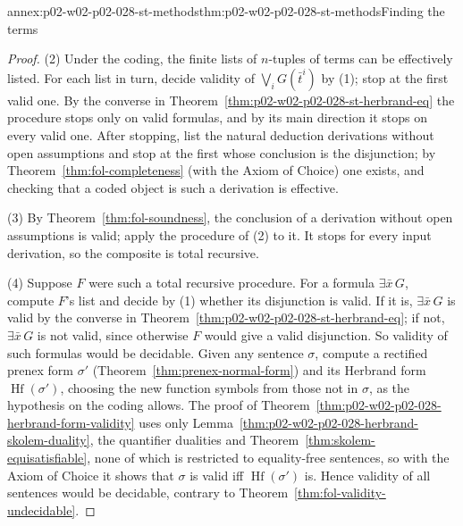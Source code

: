 \begin{annexitem}{annex:p02-w02-p02-028-st-methods}{thm:p02-w02-p02-028-st-methods}{Finding the terms}
\begin{proof}
(2)  Under the coding, the finite lists of \(n\)-tuples of terms can be
effectively listed.  For each list in turn, decide validity of
\(\bigvee_iG(\bar t^i)\) by (1); stop at the first valid one.  By the
converse in Theorem~\ref{thm:p02-w02-p02-028-st-herbrand-eq} the procedure
stops only on valid formulas, and by its main direction it stops on every
valid one.  After stopping, list the natural deduction derivations without
open assumptions and stop at the first whose conclusion is the disjunction;
by Theorem~\ref{thm:fol-completeness} (with the Axiom of Choice) one exists,
and checking that a coded object is such a derivation is effective.

(3)  By Theorem~\ref{thm:fol-soundness}, the conclusion of a derivation
without open assumptions is valid; apply the procedure of (2) to it.  It
stops for every input derivation, so the composite is total recursive.

(4)  Suppose \(F\) were such a total recursive procedure.  For a formula
\(\exists\bar x\,G\), compute \(F\)'s list and decide by (1) whether its
disjunction is valid.  If it is, \(\exists\bar x\,G\) is valid by the
converse in Theorem~\ref{thm:p02-w02-p02-028-st-herbrand-eq}; if not,
\(\exists\bar x\,G\) is not valid, since otherwise \(F\) would give a valid
disjunction.  So validity of such formulas would be decidable.  Given any
sentence \(\sigma\), compute a rectified prenex form \(\sigma'\)
(Theorem~\ref{thm:prenex-normal-form}) and its Herbrand form
\(\operatorname{Hf}(\sigma')\), choosing the new function symbols from those
not in \(\sigma\), as the hypothesis on the coding allows.  The proof of
Theorem~\ref{thm:p02-w02-p02-028-herbrand-form-validity} uses only
Lemma~\ref{thm:p02-w02-p02-028-herbrand-skolem-duality}, the quantifier
dualities and Theorem~\ref{thm:skolem-equisatisfiable}, none of which is
restricted to equality-free sentences, so with the Axiom of Choice it shows
that \(\sigma\) is valid iff \(\operatorname{Hf}(\sigma')\) is.  Hence
validity of all sentences would be decidable, contrary to
Theorem~\ref{thm:fol-validity-undecidable}.
\end{proof}
\end{annexitem}

